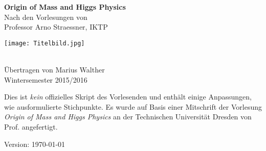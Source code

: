 \documentclass[a4paper,11pt,fleqn,parskip=full,captions=tableheading,draft]{scrbook}
\date{\today}
\newcommand{\lectitel}{Origin of Mass and Higgs Physics}
\newcommand{\authors}{Marius Walther}
\begin{document}
\begin{titlepage}
	
\begin{center}
	{\fontsize{32}{40} \selectfont \textcolor{dpurple}{\textbf{\lectitel}}}\\[1.2cm]
	{\large Nach den Vorlesungen von}\\[0.3cm]
	{\LARGE Professor Arno Straessner, IKTP}\\[2cm]
	\makebox[\linewidth]{\textcolor{lpurple}{\rule{\paperwidth}{1.3cm}}}
\end{center}
\vspace{-.7cm}
\hspace{-4.5cm}\texttt{[image: Titelbild.jpg]}
\vspace{-1cm}
\begin{center}
	\makebox[\linewidth]{\textcolor{lpurple}{\rule{\paperwidth}{1.3cm}}}\\[1cm]
	{\large Übertragen von \authors}\\[0.5cm]
	{\large Wintersemester 2015/2016}
\end{center}
\end{titlepage}
\newpage
\thispagestyle{empty}
\null\vspace {.66\textheight}
Dies ist \emph{kein} offizielles Skript des Vorlesenden und enthält einige
Anpassungen, wie ausformulierte Stichpunkte. Es wurde auf Basis
einer Mitschrift der Vorlesung \textit{Origin of Mass and Higgs Physics} an der
Technischen Universität Dresden von Prof.  angefertigt.

Version: \today
\restoregeometry

\tableofcontents


%
%
%
%
\end{document}
